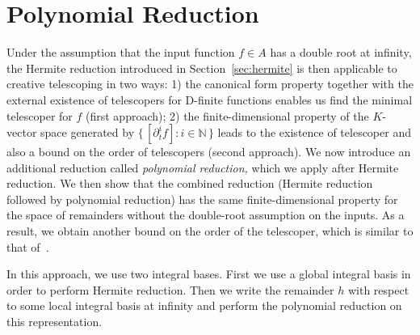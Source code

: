 \documentclass[final,1p,times,authoryear]{elsarticle}
\let\set\mathbb
\begin{document}
\section{Polynomial Reduction}\label{sec:polynomial}
Under the assumption that the input function  $f\in A$ has a double root at infinity,
the Hermite reduction introduced in Section~\ref{sec:hermite} is then applicable
to creative telescoping in two ways: 1)
the canonical form property together with the external existence of telescopers for D-finite functions
enables us find the minimal telescoper for $f$ (first approach); 2) the finite-dimensional property
of the $K$-vector space generated by $\bigl\{\,[\partial_t^if]:i\in\set N\,\bigr\}$ leads to
the existence of telescoper and also a bound on the order of telescopers (second approach).
We now introduce an additional reduction called \emph{polynomial reduction,} which we apply after
Hermite reduction. We then show that the combined reduction (Hermite reduction
followed by polynomial reduction) has the same finite-dimensional property for the
space of remainders without the double-root assumption on the inputs.
As a result, we obtain another bound on the order of the telescoper,
which is similar to that of~\cite{chen14a}.


In this approach, we use two integral bases. First we use a global integral basis
in order to perform Hermite reduction. Then we write the
remainder $h$ with respect to some local integral basis at infinity and perform the
polynomial reduction on this representation.
\end{document}
